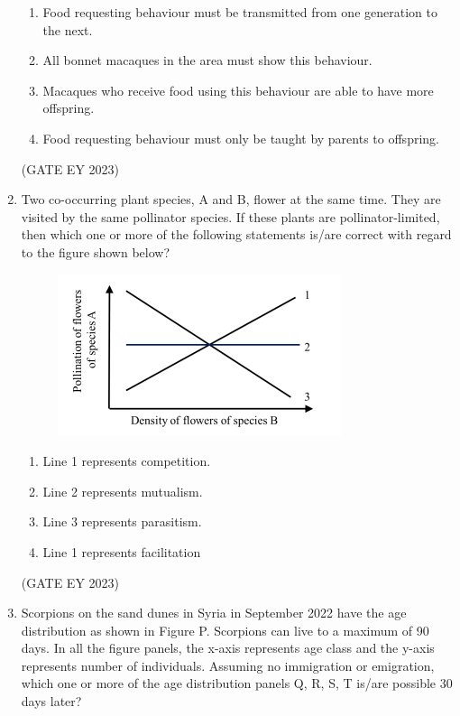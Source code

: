 \documentclass[journal,12pt,onecolumn]{IEEEtran}
\theoremstyle{remark}
\begin{document}
\begin{enumerate}
\begin{enumerate}
\item Food requesting behaviour must be transmitted from one generation to the next.
\item All bonnet macaques in the area must show this behaviour.
\item Macaques who receive food using this behaviour are able to have more offspring.
\item Food requesting behaviour must only be taught by parents to offspring.


\end{enumerate}


\hfill{(GATE EY 2023)}

 \item Two co-occurring plant species, A and B, flower at the same time. They are visited
by the same pollinator species. If these plants are pollinator-limited, then which
one or more of the following statements is/are correct with regard to the figure
shown below?

\begin{figure}[H]
    \centering
    \includegraphics[]{figs/Q.60.png}
    \caption{}
    \label{fig:}
\end{figure}
\begin{enumerate}

\item Line 1 represents competition.
\item Line 2 represents mutualism.
\item Line 3 represents parasitism.
\item Line 1 represents facilitation


\end{enumerate}


\hfill{(GATE EY 2023)}


 \item Scorpions on the sand dunes in Syria in September 2022 have the age distribution
as shown in Figure P. Scorpions can live to a maximum of 90 days. In all the
figure panels, the x-axis represents age class and the y-axis represents number of
individuals.
Assuming no immigration or emigration, which one or more of the age distribution
panels Q, R, S, T is/are possible 30 days later?


\end{enumerate}
\end{document}
